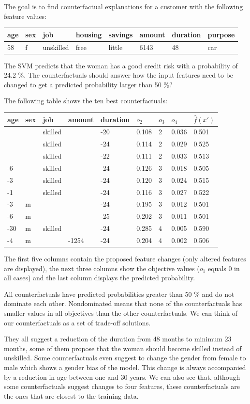 \documentclass[
  10pt,
]{scrbook}
\begin{document}
The goal is to find counterfactual explanations for a customer with the following feature values:

\begin{longtable}[]{@{}llllllll@{}}
\toprule
age & sex & job & housing & savings & amount & duration & purpose\tabularnewline
\midrule
\endhead
58 & f & unskilled & free & little & 6143 & 48 & car\tabularnewline
\bottomrule
\end{longtable}

The SVM predicts that the woman has a good credit risk with a probability of 24.2 \%.
The counterfactuals should answer how the input features need to be changed to get a predicted probability larger than 50 \%?

The following table shows the ten best counterfactuals:

\begin{longtable}[]{@{}lllllllll@{}}
\toprule
age & sex & job & amount & duration & \(o_2\) & \(o_3\) & \(o_4\) & \(\hat{f}(x')\)\tabularnewline
\midrule
\endhead
& & skilled & & -20 & 0.108 & 2 & 0.036 & 0.501\tabularnewline
& & skilled & & -24 & 0.114 & 2 & 0.029 & 0.525\tabularnewline
& & skilled & & -22 & 0.111 & 2 & 0.033 & 0.513\tabularnewline
-6 & & skilled & & -24 & 0.126 & 3 & 0.018 & 0.505\tabularnewline
-3 & & skilled & & -24 & 0.120 & 3 & 0.024 & 0.515\tabularnewline
-1 & & skilled & & -24 & 0.116 & 3 & 0.027 & 0.522\tabularnewline
-3 & m & & & -24 & 0.195 & 3 & 0.012 & 0.501\tabularnewline
-6 & m & & & -25 & 0.202 & 3 & 0.011 & 0.501\tabularnewline
-30 & m & skilled & & -24 & 0.285 & 4 & 0.005 & 0.590\tabularnewline
-4 & m & & -1254 & -24 & 0.204 & 4 & 0.002 & 0.506\tabularnewline
\bottomrule
\end{longtable}

The first five columns contain the proposed feature changes (only altered features are displayed), the next three columns show the objective values (\(o_1\) equals 0 in all cases) and the last column displays the predicted probability.

All counterfactuals have predicted probabilities greater than 50 \% and do not dominate each other.
Nondominated means that none of the counterfactuals has smaller values in all objectives than the other counterfactuals.
We can think of our counterfactuals as a set of trade-off solutions.

They all suggest a reduction of the duration from 48 months to minimum 23 months, some of them propose that the woman should become skilled instead of unskilled.
Some counterfactuals even suggest to change the gender from female to male which shows a gender bias of the model.
This change is always accompanied by a reduction in age between one and 30 years.
We can also see that, although some counterfactuals suggest changes to four features, these counterfactuals are the ones that are closest to the training data.
\end{document}

